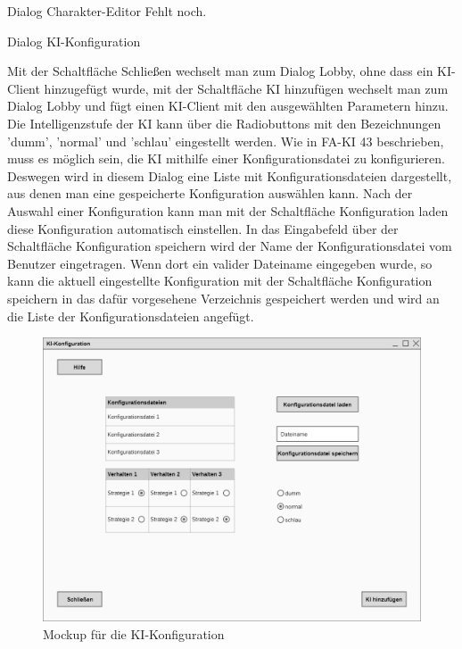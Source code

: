 Dialog \glqq{}Charakter-Editor\grqq{}
Fehlt noch.

Dialog \glqq{}KI-Konfiguration\grqq{}

Mit der Schaltfläche \glqq{}Schließen\grqq{} wechselt man zum Dialog \glqq{}Lobby\grqq{}, ohne dass ein KI-Client hinzugefügt wurde, mit der Schaltfläche \glqq{}KI hinzufügen\grqq{} wechselt man zum Dialog \glqq{}Lobby\grqq{} und fügt einen KI-Client mit den ausgewählten Parametern hinzu.
Die Intelligenzstufe der KI kann über die Radiobuttons mit den Bezeichnungen 'dumm', 'normal' und 'schlau' eingestellt werden.
Wie in FA-KI 43 beschrieben, muss es möglich sein, die KI mithilfe einer Konfigurationsdatei zu konfigurieren. Deswegen wird in diesem Dialog eine Liste mit Konfigurationsdateien dargestellt, aus denen man eine gespeicherte Konfiguration auswählen kann. Nach der Auswahl einer Konfiguration kann man mit der Schaltfläche \glqq{}Konfiguration laden\grqq{} diese Konfiguration automatisch einstellen.
In das Eingabefeld über der Schaltfläche \glqq{}Konfiguration speichern\grqq{} wird der Name der Konfigurationsdatei vom Benutzer eingetragen. Wenn dort ein valider Dateiname eingegeben wurde, so kann die aktuell eingestellte Konfiguration mit der Schaltfläche \glqq{}Konfiguration speichern\grqq{} in das dafür vorgesehene Verzeichnis gespeichert werden und wird an die Liste der Konfigurationsdateien angefügt.

\begin{figure}[H]
  \centering
  \includegraphics[width=\textwidth]{Meilenstein03/KI-Konfiguration_Mockup.png}
  \caption{Mockup für die KI-Konfiguration}
\end{figure}

